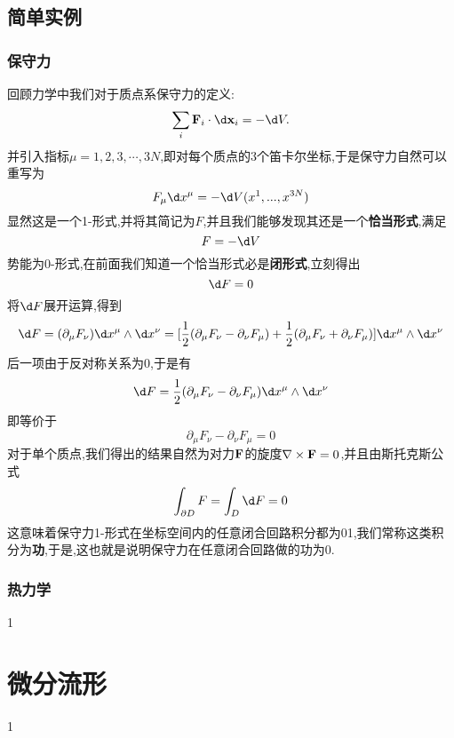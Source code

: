 \subsection{简单实例}
\subsubsection{保守力}
回顾力学中我们对于质点系保守力的定义:
\begin{equation}
    \sum_i\mathbf{F}_i\cdot \d\mathbf{x}_i=-\d V.
\end{equation}
并引入指标$\mu=1,2,3,\cdots,3N$,即对每个质点的3个笛卡尔坐标,于是保守力自然可以重写为
\begin{equation}
    F_\mu \dx^\mu=-\d V(x^1,...,x^{3N})
\end{equation}
显然这是一个1-形式,并将其简记为$ F $,并且我们能够发现其还是一个\textbf{恰当形式},满足
\begin{equation}
    F=-\d V
\end{equation}
势能为0-形式,在前面我们知道一个恰当形式必是\textbf{闭形式},立刻得出
\begin{equation}
    \d F=0
\end{equation}
将$\d F$展开运算,得到
\begin{equation}
    \d F=(\partial_\mu F_\nu)\dx^\mu\wedge \dx^\nu=[\frac{1}{2}(\partial_\mu F_\nu-\partial_\nu F_\mu)+\frac{1}{2}(\partial_\mu F_\nu+\partial_\nu F_\mu)]\dx^\mu\wedge \dx^\nu
\end{equation}
后一项由于反对称关系为$ 0 $,于是有
\begin{equation}
    \d F=\frac{1}{2}(\partial_\mu F_\nu-\partial_\nu F_\mu)\dx^\mu\wedge \dx^\nu
\end{equation}
即等价于
\begin{equation}
    \partial_\mu F_\nu-\partial_\nu F_\mu=0
\end{equation}
对于单个质点,我们得出的结果自然为对力$\mathbf{F}$的旋度$\nabla\times\mathbf{F}=0$,并且由斯托克斯公式
\begin{equation}
    \int_{\partial D}F=\int_D\d F=0
\end{equation}
这意味着保守力1-形式在坐标空间内的任意闭合回路积分都为01,我们常称这类积分为\textbf{功},于是,这也就是说明保守力在任意闭合回路做的功为$ 0 $.

\subsubsection{热力学}
1
\section{微分流形}
1
